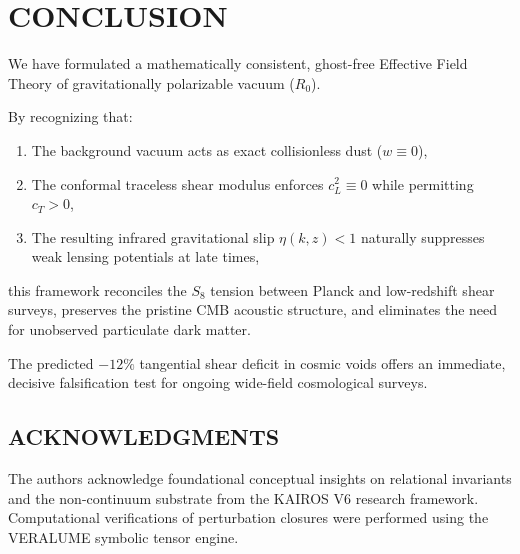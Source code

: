 \documentclass[10pt,twocolumn]{article}
\begin{document}
\section{CONCLUSION}

We have formulated a mathematically consistent, ghost-free Effective Field Theory of gravitationally polarizable vacuum ($R_0$). 

By recognizing that:
\begin{enumerate}
  \item The background vacuum acts as exact collisionless dust ($w \equiv 0$),
  \item The conformal traceless shear modulus enforces $c_L^2 \equiv 0$ while permitting $c_T > 0$,
  \item The resulting infrared gravitational slip $\eta(k,z) < 1$ naturally suppresses weak lensing potentials at late times,
\end{enumerate}

this framework reconciles the $S_8$ tension between Planck and low-redshift shear surveys, preserves the pristine CMB acoustic structure, and eliminates the need for unobserved particulate dark matter.

The predicted $-12\%$ tangential shear deficit in cosmic voids offers an immediate, decisive falsification test for ongoing wide-field cosmological surveys.



\subsection{ACKNOWLEDGMENTS}

The authors acknowledge foundational conceptual insights on relational invariants and the non-continuum substrate from the KAIROS V6 research framework. Computational verifications of perturbation closures were performed using the VERALUME symbolic tensor engine.
\end{document}
